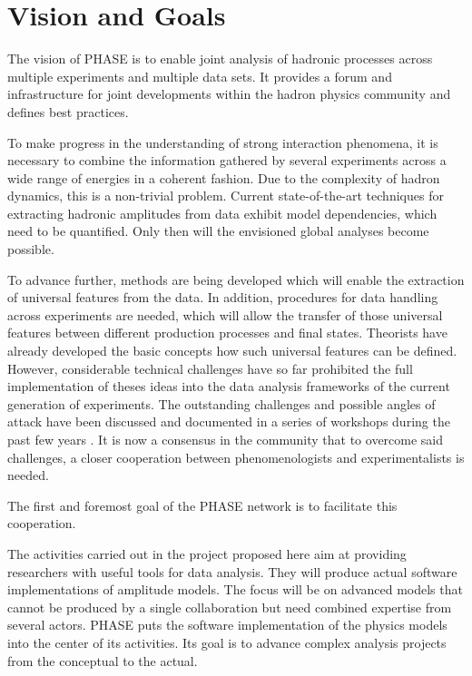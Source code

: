 \section{Vision and Goals}

The vision of PHASE is to enable joint analysis of hadronic processes across multiple experiments and multiple data sets. It provides a forum and infrastructure for joint developments within the hadron physics community and defines best practices.

To make progress in the understanding of strong interaction phenomena, it is necessary to combine the information gathered by several experiments across a wide range of energies in a coherent fashion. Due to the complexity of hadron dynamics, this is a non-trivial problem. Current state-of-the-art techniques for extracting hadronic amplitudes from data exhibit model dependencies, which need to be quantified. Only then will the envisioned global analyses become possible.

To advance further, methods are being developed which will enable the extraction of universal features from the data. In addition, procedures for data handling across experiments are needed, which will allow the transfer of those universal features between different production processes and final states. Theorists have already developed the basic concepts how such universal features can be defined. However, considerable technical challenges have so far prohibited the full implementation of theses ideas into the data analysis frameworks of the current generation of experiments. The outstanding challenges and possible angles of attack have been discussed and documented in a series of workshops during the past few years \cite{Battaglieri_2015, Brice_o_2016, Lutz_2016}. It is now a consensus in the community that to overcome said challenges, a closer cooperation between phenomenologists and experimentalists is needed.

The first and foremost goal of the PHASE network is to facilitate this cooperation. 

The activities carried out in the project proposed here aim at providing researchers with useful tools for data analysis. They will produce actual software implementations of amplitude models. The focus will be on advanced models that cannot be produced by a single collaboration but need combined expertise from several actors. PHASE puts the software implementation of the physics models into the center of its activities. Its goal is to advance complex analysis projects from the conceptual to the actual.





